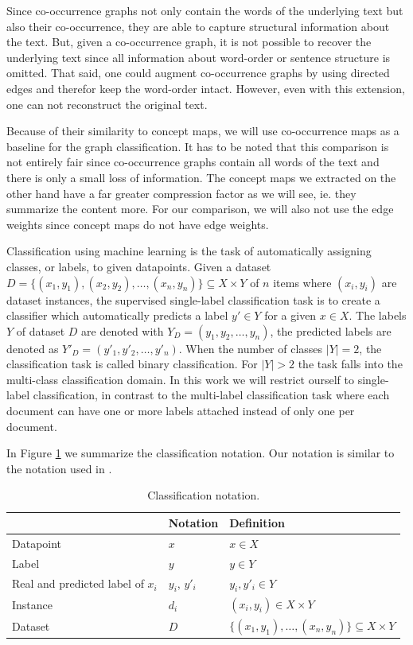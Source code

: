 Since co-occurrence graphs not only contain the words of the underlying text but also their co-occurrence, they are able to capture structural information about the text.
But, given a co-occurrence graph, it is not possible to recover the underlying text since all information about word-order or sentence structure is omitted.
That said, one could augment co-occurrence graphs by using directed edges and therefor keep the word-order intact.
However, even with this extension, one can not reconstruct the original text.

Because of their similarity to concept maps, we will use co-occurrence maps as a baseline for the graph classification.
It has to be noted that this comparison is not entirely fair since co-occurrence graphs contain all words of the text and there is only a small loss of information.
The concept maps we extracted on the other hand have a far greater compression factor as we will see, ie. they summarize the content more.
For our comparison, we will also not use the edge weights since concept maps do not have edge weights.


Classification using machine learning is the task of automatically assigning classes, or labels, to given datapoints.
Given a dataset $D = \{(x_1, y_1), (x_2, y_2), \ldots, (x_n, y_n) \} \subseteq X \times Y$ of $n$ items where $(x_i, y_i)$ are dataset instances, the supervised single-label classification task is to create a classifier which automatically predicts a label $y' \in Y$ for a given $x \in X$.
The labels $Y$ of dataset $D$ are denoted with $Y_D = (y_1, y_2, \ldots, y_n )$, the predicted labels are denoted as $Y'_D = (y'_1, y'_2, \ldots, y'_n )$.
When the number of classes $|Y| = 2$, the classification task is called binary classification. For $|Y| > 2$ the task falls into the multi-class classification domain.
In this work we will restrict ourself to single-label classification, in contrast to the multi-label classification task where each document can have one or more labels attached instead of only one per document.

In Figure \ref{table:classification_notation} we summarize the classification notation.
Our notation is similar to the notation used in \cite[p.~11]{Bishop2006}.

\begin{table}[htb!]
	\centering
	\begin{tabular}{lll}
		& Notation & Definition \\
		\toprule
		Datapoint & $x$ & $x \in X$
		\\
		Label & $y$ & $y \in Y$
		\\
		Real and predicted label of $x_i$ & $y_i$, $y'_i$ &  $y_i, y'_i \in Y$
		\\
		Instance & $d_i$ & $(x_i, y_i) \in X \times Y$
		\\
		Dataset & $D$ & $\{(x_1, y_1), \ldots, (x_n, y_n) \} \subseteq X \times Y$ 
	\end{tabular}
	\caption[Notation: Classification]{Classification notation.}\label{table:classification_notation}
\end{table}

